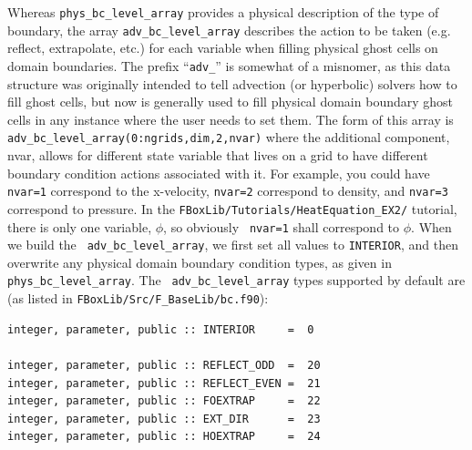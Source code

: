 Whereas {\tt phys\_bc\_level\_array} provides a physical description
of the type of boundary, the array {\tt adv\_bc\_level\_array}
describes the action to be taken (e.g. reflect, extrapolate, etc.) for
each variable when filling physical ghost cells on domain boundaries.
The prefix ``{\tt adv\_}'' is somewhat of a misnomer, as this data
structure was originally intended to tell advection (or hyperbolic)
solvers how to fill ghost cells, but now is generally used to fill
physical domain boundary ghost cells in any instance where the user
needs to set them.  The form of this array is {\tt
  adv\_bc\_level\_array(0:ngrids,dim,2,nvar)} where the additional
component, nvar, allows for different state variable that lives on a
grid to have different boundary condition actions associated with it.
For example, you could have {\tt nvar=1} correspond to the x-velocity,
{\tt nvar=2} correspond to density, and {\tt nvar=3} correspond to
pressure.  In the {\tt FBoxLib/Tutorials/HeatEquation\_EX2/}
tutorial, there is only one variable, $\phi$, so obviously {\tt
  nvar=1} shall correspond to $\phi$.  When we build the {\tt
  adv\_bc\_level\_array}, we first set all values to {\tt INTERIOR},
and then overwrite any physical domain boundary condition types, as
given in {\tt phys\_bc\_level\_array}.  The {\tt
  adv\_bc\_level\_array} types supported by default are (as listed in
{\tt FBoxLib/Src/F\_BaseLib/bc.f90}):
\begin{lstlisting}[backgroundcolor=\color{light-green}]
integer, parameter, public :: INTERIOR     =  0

integer, parameter, public :: REFLECT_ODD  =  20
integer, parameter, public :: REFLECT_EVEN =  21
integer, parameter, public :: FOEXTRAP     =  22
integer, parameter, public :: EXT_DIR      =  23
integer, parameter, public :: HOEXTRAP     =  24
\end{lstlisting}

